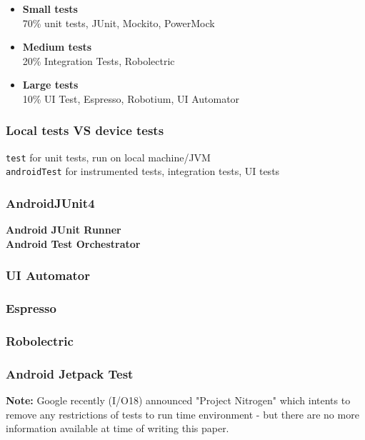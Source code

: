 \begin{itemize}
	\item \textbf{Small tests} \\ 
	70\% unit tests, JUnit, Mockito, PowerMock
	
	\item \textbf{Medium tests} \\ 
	 20\% Integration Tests, Robolectric
	 
	\item \textbf{Large tests} \\ 
	 10\% UI Test, Espresso, Robotium, UI Automator
\end{itemize}

\subsubsection{Local tests VS device tests}\label{sec:test_types}

\texttt{test} for unit tests, run on local machine/JVM \\
\texttt{androidTest} for instrumented tests, integration tests, UI tests

\subsubsection{AndroidJUnit4}
\textbf{Android JUnit Runner} \\
\textbf{Android Test Orchestrator}

\subsubsection{UI Automator}
\subsubsection{Espresso}
\subsubsection{Robolectric}
\subsubsection{Android Jetpack Test}

\begin{mdframed}[style=InfoBox,align=center]
	\textbf{Note:} Google recently (I/O18) announced "Project Nitrogen" which intents to remove any restrictions of tests to run time environment - but there are no more information available at time of writing this paper.
\end{mdframed}

